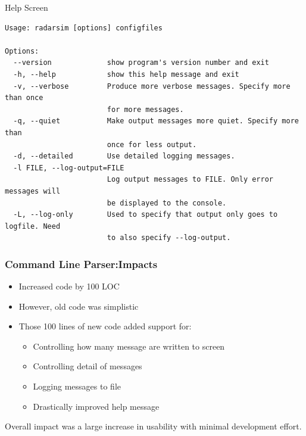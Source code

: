 \documentclass[red, hyperref={pdfpagelabels=false}]{beamer}
\begin{document}
\begin{frame}[fragile]{Help Screen}
\tiny
\begin{verbatim}
Usage: radarsim [options] configfiles

Options:
  --version             show program's version number and exit
  -h, --help            show this help message and exit
  -v, --verbose         Produce more verbose messages. Specify more than once
                        for more messages.
  -q, --quiet           Make output messages more quiet. Specify more than
                        once for less output.
  -d, --detailed        Use detailed logging messages.
  -l FILE, --log-output=FILE
                        Log output messages to FILE. Only error messages will
                        be displayed to the console.
  -L, --log-only        Used to specify that output only goes to logfile. Need
                        to also specify --log-output.
\end{verbatim}
\end{frame}

\begin{frame}
  \frametitle{Command Line Parser:Impacts}
  \begin{itemize}
    \item Increased code by 100 LOC
    \item However, old code was simplistic
    \item Those 100 lines of new code added support for:
    \begin{itemize}
      \item Controlling how many message are written to screen
      \item Controlling detail of messages
      \item Logging messages to file
      \item Drastically improved help message
    \end{itemize}
  \end{itemize}
  Overall impact was a large increase in usability with minimal development effort.
\end{frame}
\end{document}
